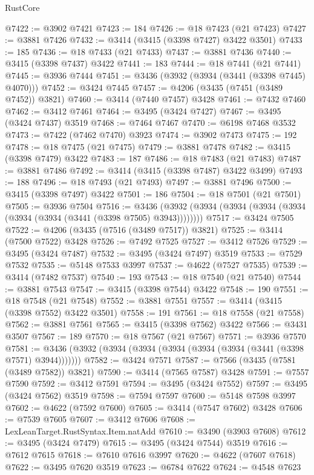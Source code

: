 \begin{lexlean}{RustCore}
\begin{coremodule}
@7422 := @3902 @7421
@7423 := 184
@7426 := @18 @7423 (@21 @7423)
@7427 := @3881 @7426
@7432 := @3414 (@3415 (@3398 @7427) @3422 @3501)
@7433 := 185
@7436 := @18 @7433 (@21 @7433)
@7437 := @3881 @7436
@7440 := @3415 (@3398 @7437) @3422
@7441 := 183
@7444 := @18 @7441 (@21 @7441)
@7445 := @3936 @7444
@7451 := @3436 (@3932 (@3934 (@3441 (@3398 @7445) @4070)))
@7452 := @3424 @7445
@7457 := @4206 (@3435 (@7451 (@3489 @7452)) @3821)
@7460 := @3414 (@7440 @7457) @3428
@7461 := @7432 @7460
@7462 := @3412 @7461
@7464 := @3495 (@3424 @7427)
@7467 := @3495 (@3424 @7437) @3519
@7468 := @7464 @7467
@7470 := @6198 @7468 @3532
@7473 := @7422 (@7462 @7470) @3923
@7474 := @3902 @7473
@7475 := 192
@7478 := @18 @7475 (@21 @7475)
@7479 := @3881 @7478
@7482 := @3415 (@3398 @7479) @3422
@7483 := 187
@7486 := @18 @7483 (@21 @7483)
@7487 := @3881 @7486
@7492 := @3414 (@3415 (@3398 @7487) @3422 @3499)
@7493 := 188
@7496 := @18 @7493 (@21 @7493)
@7497 := @3881 @7496
@7500 := @3415 (@3398 @7497) @3422
@7501 := 186
@7504 := @18 @7501 (@21 @7501)
@7505 := @3936 @7504
@7516 := @3436 (@3932 (@3934 (@3934 (@3934 (@3934 (@3934 (@3934 (@3441 (@3398 @7505) @3943))))))))
@7517 := @3424 @7505
@7522 := @4206 (@3435 (@7516 (@3489 @7517)) @3821)
@7525 := @3414 (@7500 @7522) @3428
@7526 := @7492 @7525
@7527 := @3412 @7526
@7529 := @3495 (@3424 @7487)
@7532 := @3495 (@3424 @7497) @3519
@7533 := @7529 @7532
@7535 := @5148 @7533 @3997
@7537 := @4622 (@7527 @7535)
@7539 := @3414 (@7482 @7537)
@7540 := 193
@7543 := @18 @7540 (@21 @7540)
@7544 := @3881 @7543
@7547 := @3415 (@3398 @7544) @3422
@7548 := 190
@7551 := @18 @7548 (@21 @7548)
@7552 := @3881 @7551
@7557 := @3414 (@3415 (@3398 @7552) @3422 @3501)
@7558 := 191
@7561 := @18 @7558 (@21 @7558)
@7562 := @3881 @7561
@7565 := @3415 (@3398 @7562) @3422
@7566 := @3431 @3507
@7567 := 189
@7570 := @18 @7567 (@21 @7567)
@7571 := @3936 @7570
@7581 := @3436 (@3932 (@3934 (@3934 (@3934 (@3934 (@3934 (@3441 (@3398 @7571) @3944)))))))
@7582 := @3424 @7571
@7587 := @7566 (@3435 (@7581 (@3489 @7582)) @3821)
@7590 := @3414 (@7565 @7587) @3428
@7591 := @7557 @7590
@7592 := @3412 @7591
@7594 := @3495 (@3424 @7552)
@7597 := @3495 (@3424 @7562) @3519
@7598 := @7594 @7597
@7600 := @5148 @7598 @3997
@7602 := @4622 (@7592 @7600)
@7605 := @3414 (@7547 @7602) @3428
@7606 := @7539 @7605
@7607 := @3412 @7606
@7608 := LexLeanTarget.RustSyntax.Item.natAdd
@7610 := @3490 (@3903 @7608)
@7612 := @3495 (@3424 @7479)
@7615 := @3495 (@3424 @7544) @3519
@7616 := @7612 @7615
@7618 := @7610 @7616 @3997
@7620 := @4622 (@7607 @7618)
@7622 := @3495 @7620 @3519
@7623 := @6784 @7622
@7624 := @4548 @7623

\end{coremodule}
\end{lexlean}
